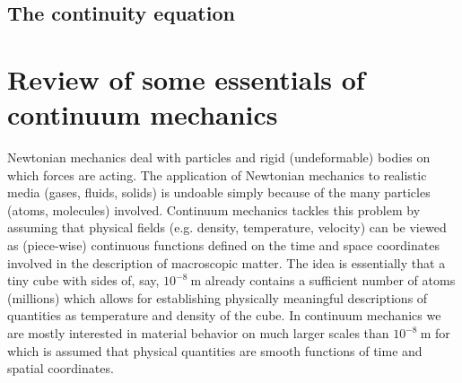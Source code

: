 \begin{center}
\end{center}

\subsection{The continuity equation} 

\section{Review of some essentials of continuum mechanics}


Newtonian mechanics deal with particles and rigid (undeformable) bodies on which
forces are acting. The application of Newtonian mechanics to realistic media (gases,
fluids, solids) is undoable simply because of the many particles (atoms, molecules)
involved. Continuum mechanics tackles this problem by assuming that physical fields
(e.g. density, temperature, velocity) can be viewed as (piece-wise) continuous functions
defined on the time and space coordinates involved in the description of macroscopic
matter. The idea is essentially that a tiny cube with sides of, 
say, $10^{-8}~\si{\meter}$ already contains
a sufficient number of atoms (millions) which allows for establishing physically
meaningful descriptions of quantities as temperature and density of the cube. In
continuum mechanics we are mostly interested in material behavior on much larger scales
than $10^{-8}~\si{\meter}$ for which is assumed that physical quantities 
are smooth functions of time and spatial coordinates.

